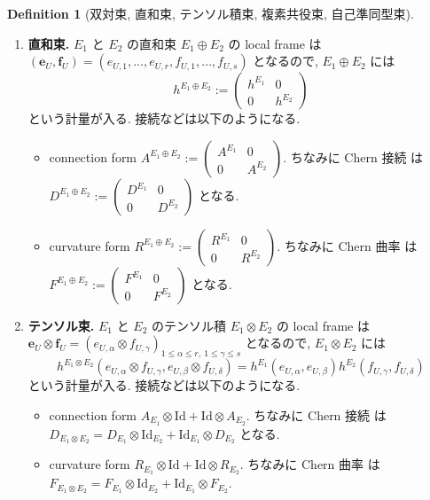 \documentclass[dvipdfmx,a4paper,11pt]{article} %
\theoremstyle{definition}
\newtheorem{defn}[thm]{Definition}
\theoremstyle{remark}
\numberwithin{equation}{section}
\begin{document}
\begin{defn}[双対束, 直和束, テンソル積束, 複素共役束, 自己準同型束]
\begin{enumerate}
\item \textbf{直和束.} \(E_1\) と \(E_2\) の直和束 \(E_1 \oplus E_2\) の local frame は \(
(\mathbf{e}_U,\mathbf{f}_U)=(e_{U,1},\ldots,e_{U,r},f_{U,1},\ldots,f_{U,s})\)
となるので, \(E_1 \oplus E_2\) には
\[
h^{E_1 \oplus E_2}
:= 
\begin{pmatrix}
h^{E_1} & 0\\
0 & h^{E_2}
\end{pmatrix}
\]
という計量が入る. 接続などは以下のようになる.
\begin{itemize}
\item connection form
\(
A^{E_1 \oplus E_2}
:= 
\begin{pmatrix}
A^{E_1} & 0\\
0 & A^{E_2}
\end{pmatrix}.
\)
ちなみに Chern 接続 は
\(
D^{E_1 \oplus E_2}
:= 
\begin{pmatrix}
D^{E_1} & 0\\
0 & D^{E_2}
\end{pmatrix}
\)
となる.
\item curvature form
\(
R^{E_1 \oplus E_2}
:= 
\begin{pmatrix}
R^{E_1} & 0\\
0 & R^{E_2}
\end{pmatrix}.
\)
ちなみに Chern 曲率 は
\(
F^{E_1 \oplus E_2}
:= 
\begin{pmatrix}
F^{E_1} & 0\\
0 & F^{E_2}
\end{pmatrix}
\)
となる.
\end{itemize}

\item \textbf{テンソル束.}
 \(E_1\) と \(E_2\) のテンソル積 \(E_1 \otimes E_2\) の local frame は \(\mathbf{e}_U\otimes\mathbf{f}_U=(e_{U,\alpha}\otimes f_{U,\gamma})_{1\leq \alpha\leq r,\ 1\leq \gamma\leq s}\)
となるので, \(E_1 \otimes E_2\) には
\[
h^{E_1 \otimes E_2}(e_{U,\alpha}\otimes f_{U,\gamma}, e_{U,\beta}\otimes f_{U,\delta})
= h^{E_1}(e_{U,\alpha},  e_{U,\beta})h^{E_2}( f_{U,\gamma},  f_{U,\delta})
\]
という計量が入る. 接続などは以下のようになる.
\begin{itemize}
\item connection form
\(
A_{E_1}\otimes \mathrm{Id}+\mathrm{Id}\otimes A_{E_2}.
\)
ちなみに Chern 接続 は
\(
D_{E_1\otimes E_2}=D_{E_1}\otimes \mathrm{Id}_{E_2}+\mathrm{Id}_{E_1}\otimes D_{E_2}
\)
となる.
\item curvature form
\(
R_{E_1}\otimes \mathrm{Id}+\mathrm{Id}\otimes R_{E_2}.
\)
ちなみに Chern 曲率 は
\(
F_{E_1\otimes E_2}=F_{E_1}\otimes \mathrm{Id}_{E_2}+\mathrm{Id}_{E_1}\otimes F_{E_2}.
\)
\end{itemize}


\end{enumerate}
\end{defn}
\end{document}
